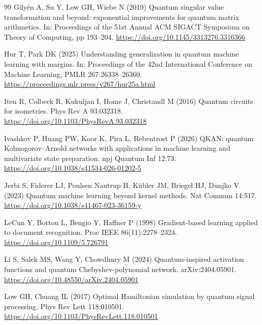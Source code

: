 \documentclass[pdflatex,sn-mathphys,NameDate,iicol]{sn-jnl}
\begin{document}
\begin{thebibliography}{99}
Gily{\'e}n A, Su Y, Low GH, Wiebe N (2019) Quantum singular value
transformation and beyond: exponential improvements for quantum matrix
arithmetics. In: Proceedings of the 51st Annual ACM SIGACT Symposium on
Theory of Computing, pp 193--204.
\url{https://doi.org/10.1145/3313276.3316366}

Hur T, Park DK (2025) Understanding generalization in quantum machine
learning with margins. In: Proceedings of the 42nd International Conference
on Machine Learning, PMLR 267:26338--26360.
\url{https://proceedings.mlr.press/v267/hur25a.html}

Iten R, Colbeck R, Kukuljan I, Home J, Christandl M (2016) Quantum circuits
for isometries. Phys Rev A 93:032318.
\url{https://doi.org/10.1103/PhysRevA.93.032318}

Ivashkov P, Huang PW, Koor K, Pira L, Rebentrost P (2026) QKAN: quantum
Kolmogorov--Arnold networks with applications in machine learning and
multivariate state preparation. npj Quantum Inf 12:73.
\url{https://doi.org/10.1038/s41534-026-01202-5}

Jerbi S, Fiderer LJ, Poulsen Nautrup H, K{\"u}bler JM, Briegel HJ, Dunjko V
(2023) Quantum machine learning beyond kernel methods. Nat Commun 14:517.
\url{https://doi.org/10.1038/s41467-023-36159-y}

LeCun Y, Bottou L, Bengio Y, Haffner P (1998) Gradient-based learning applied
to document recognition. Proc IEEE 86(11):2278--2324.
\url{https://doi.org/10.1109/5.726791}

Li S, Salek MS, Wang Y, Chowdhury M (2024) Quantum-inspired activation
functions and quantum Chebyshev-polynomial network. arXiv:2404.05901.
\url{https://doi.org/10.48550/arXiv.2404.05901}

Low GH, Chuang IL (2017) Optimal Hamiltonian simulation by quantum signal
processing. Phys Rev Lett 118:010501.
\url{https://doi.org/10.1103/PhysRevLett.118.010501}


\end{thebibliography}
\end{document}
